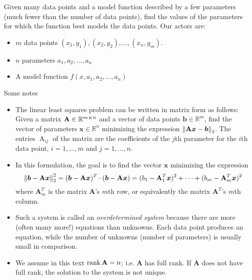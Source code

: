 \documentclass[11pt, a4paper]{article}
\newcommand{\R}{\mathbb{R}} %
\newcommand{\mat}[1]{\mathbf{#1}} %
\begin{document}
Given many data points and a model function described by a few parameters (much fewer than the number of data points), find the values of the parameters for which the function best models the data points. Our actors are: 
\begin{itemize}
	\item $ m $ data points $ (x_1, y_1), (x_2, y_2), \dots, (x_n, y_m) $.
	
	\item $ n $ parameters $ a_1, a_2, \dots, a_n $
	
	\item A model function $ f(x, a_1, a_2, \dots, a_n) $
\end{itemize}
Some notes
\begin{itemize}

	\item The linear least squares problem can be written in matrix form as follows: Given a matrix $ \mat{A} \in \R^{m \cross n} $ and a vector of data points $ \bm{b} \in \R^{m} $, find the vector of parameters $ \bm{x} \in \R^{n} $ minimizing the expression $ \displaystyle{\norm{\mat{A} \bm{x} - \bm{b}}_{2} } $. The entries $ \operatorname{A}_{ij} $ of the matrix are the coefficients of the $ j $th parameter for the $ i $th data point, $ i = 1, \dots, m $ and $ j = 1, \dots, n $.
	
	\item In this formulation, the goal is to find the vector $ \bm{x} $ minimizing the expression
	\begin{equation*}
		\norm{\bm{b} - \mat{A}\bm{x}}^{2}_{2} = (\bm{b} - \mat{A}\bm{x})^{T} \cdot  (\bm{b} - \mat{A}\bm{x})= (b_{1} - \mat{A}^{T}_{1}\bm{x})^{2} + \cdots + (b_{m} - \mat{A}^{T}_{m}\bm{x})^{2}
	\end{equation*}
	where $ \mat{A}_{m}^{T} $ is the matrix $ \mat{A} $'s $ m $th row, or equivalently the matrix $ \mat{A}^{T} $'s $ m $th column.
	
	\item Such a system is called an \textit{overdetermined system} because there are more (often many more!) equations than unknowns. Each data point produces an equation, while the number of unknowns (number of parameters) is usually small in comparison.
	
	\item We assume in this text $ \rank \mat{A} = n $; i.e. $ \mat{A} $ has full rank. If $ \mat{A} $ does not have full rank, the solution to the system is not unique.
		
\end{itemize}
\end{document}
